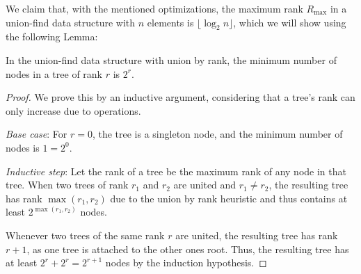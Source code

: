 We claim that, with the mentioned optimizations, the maximum rank $R_{\max}$ in a
union-find data structure with $n$ elements is $\lfloor \log_2 n \rfloor$, which
we will show using the following Lemma:

\begin{lemma}
\label{lem:node-bound}
In the union-find data structure with union by rank, the minimum number
of nodes in a tree of rank $r$ is $2^r$.
\end{lemma}

\begin{proof}
  We prove this by an inductive argument, considering that a tree's rank can
  only increase due to \union{} operations.

  \emph{Base case}: For $r = 0$, the tree is a singleton node, and the minimum
  number of nodes is $1 = 2^0$.

  \emph{Inductive step}: Let the rank of a tree be the maximum rank of any
  node in that tree.  When two trees of rank $r_1$ and $r_2$ are united and $r_1
  \neq r_2$, the resulting tree has rank $\max(r_1, r_2)$ due to the union by rank
  heuristic and thus contains at least $2^{\max(r_1, r_2)}$ nodes.

  Whenever two trees of the same rank $r$ are united, the resulting tree has rank
  $r + 1$, as one tree is attached to the other ones root. Thus, the resulting
  tree has at least $2^r + 2^r = 2^{r+1}$ nodes by the induction hypothesis.
\end{proof}

